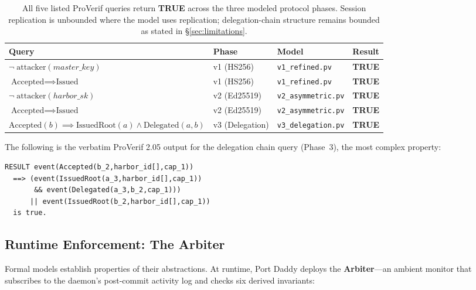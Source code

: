 \documentclass[11pt,a4paper]{article}
\theoremstyle{definition}
\begin{document}
\begin{table}[H]
\centering
\caption{All five listed ProVerif queries return \textbf{TRUE} across the three modeled protocol phases. Session replication is unbounded where the model uses replication; delegation-chain structure remains bounded as stated in \S\ref{sec:limitations}.}
\label{tab:proverif-results}
\begin{tabularx}{\textwidth}{@{}>{\raggedright\arraybackslash}X l l l@{}}
\toprule
\textbf{Query} & \textbf{Phase} & \textbf{Model} & \textbf{Result} \\
\midrule
$\neg\;\text{attacker}(\mathit{master\_key})$ & v1 (HS256) & \texttt{v1\_refined.pv} & \textbf{TRUE} \\
$\text{Accepted} \implies \text{Issued}$ & v1 (HS256) & \texttt{v1\_refined.pv} & \textbf{TRUE} \\
$\neg\;\text{attacker}(\mathit{harbor\_sk})$ & v2 (Ed25519) & \texttt{v2\_asymmetric.pv} & \textbf{TRUE} \\
$\text{Accepted} \implies \text{Issued}$ & v2 (Ed25519) & \texttt{v2\_asymmetric.pv} & \textbf{TRUE} \\
$\text{Accepted}(b) \implies \text{IssuedRoot}(a) \land \text{Delegated}(a,b)$ & v3 (Delegation) & \texttt{v3\_delegation.pv} & \textbf{TRUE} \\
\bottomrule
\end{tabularx}
\end{table}

The following is the verbatim ProVerif 2.05 output for the delegation chain query (Phase~3), the most complex property:

\begin{lstlisting}[caption={ProVerif 2.05 Terminal Output --- Phase 3 Delegation Chain}]
RESULT event(Accepted(b_2,harbor_id[],cap_1))
  ==> (event(IssuedRoot(a_3,harbor_id[],cap_1))
       && event(Delegated(a_3,b_2,cap_1)))
      || event(IssuedRoot(b_2,harbor_id[],cap_1))
  is true.
\end{lstlisting}

\subsection{Runtime Enforcement: The Arbiter}

Formal models establish properties of their abstractions. At runtime, Port Daddy deploys the \textbf{Arbiter}---an ambient monitor that subscribes to the daemon's post-commit activity log and checks six derived invariants:
\end{document}
